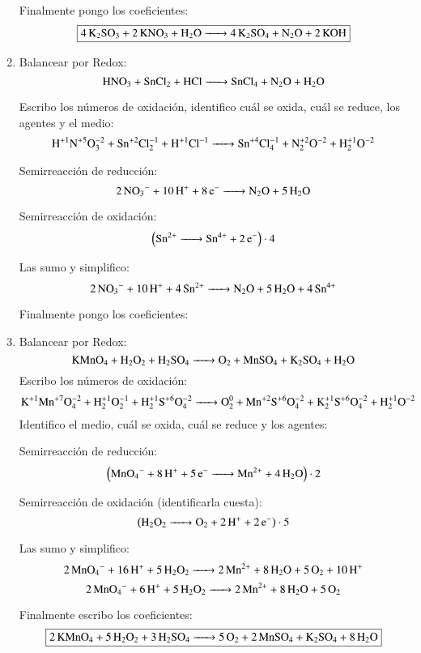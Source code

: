 \begin{enumerate}
Finalmente pongo los coeficientes:
$$\fbox{\ce{4K2SO3 + 2KNO3 + H2O ->
4K2SO4 + N2O + 2KOH}}$$

\item
Balancear por Redox:
$$\ce{
HNO3 + SnCl2 + HCl ->
SnCl4 + N2O + H2O
}$$

Escribo los números de oxidación, identifico cuál se oxida, cuál se reduce, los agentes y el medio:
$$\ce{
H^{+1}N^{+5}O^{-2}3 + Sn^{+2}Cl^{-1}2 + H^{+1}Cl^{-1} ->
Sn^{+4}Cl^{-1}4 + N^{+2}2O^{-2} + H^{+1}2O^{-2}
}$$


\begin{multicols}{2}
Semirreacción de reducción:
$$\ce{
2NO_3^- +10H^+ + 8e^- ->
N2O + 5H2O
}$$

Semirreacción de oxidación:
$$\left(\ce{
Sn^{2+} ->
Sn^{4+} + 2e^-
}\right)\cdot 4$$
\end{multicols}

Las sumo y simplifico:
$$\ce{
2NO_3^- + 10H^+ + 4Sn^{2+} ->
N2O + 5H2O + 4Sn^{4+}
}$$

Finalmente pongo los coeficientes:

\hfil{}\hfil


\item 
Balancear por Redox:
$$\ce{KMnO4 + H2O2 + H2SO4 -> O2 + MnSO4 + K2SO4 + H2O}$$
Escribo los números de oxidación:
$$\ce{
K^{+1}Mn^{+7}O^{-2}4 + H^{+1}2O^{-1}2 + H^{+1}2S^{+6}O^{-2}4 ->
O^{0}2 + Mn^{+2}S^{+6}O^{-2}4 + K^{+1}2S^{+6}O^{-2}4 + H^{+1}2O^{-2}
}$$
Identifico el medio, cuál se oxida, cuál se reduce y los agentes:

\vspace{0.5\baselineskip}
\begin{multicols}{2}
Semirreacción de reducción:
$$\left(\ce{
MnO4^- + 8H^+ + 5e^- ->
Mn^{2+} + 4H2O
}\right) \cdot 2$$

Semirreacción de oxidación (identificarla cuesta):
$$\left(\ce{
H2O2 ->
O2 + 2H^+ + 2e^-
}\right) \cdot 5$$
\end{multicols}
    
Las sumo y simplifico:
$$\ce{
2MnO4^- + 16H^+ + 5H2O2 ->
2Mn^{2+} + 8H2O + 5O2 + 10H^+
}$$
$$\ce{
2MnO4^- + 6H^+ + 5H2O2 ->
2Mn^{2+} + 8H2O + 5O2
}$$

Finalmente escribo los coeficientes:
$$\fbox{\ce{2KMnO4 + 5H2O2 + 3H2SO4 -> 5O2 + 2MnSO4 + K2SO4 + 8H2O}}$$

\end{enumerate}
